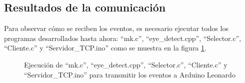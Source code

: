 \subsection{Resultados de la comunicación} \label{s4_4_3}

Para observar cómo se reciben los eventos, es necesario ejecutar todos los programas desarrollados hasta ahora: ``mk.c'', ``eye\_detect.cpp'', ``Selector.c'', ``Cliente.c'' y ``Servidor\_TCP.ino'' como se muestra en la figura \ref{fig:programas}.


\begin{figure}[htbp]
\centering
{}
\caption{Ejecución de ``mk.c'', ``eye\_detect.cpp'', ``Selector.c'', ``Cliente.c'' y ``Servidor\_TCP.ino'' para transmitir los eventos a Arduino Leonardo}
\label{fig:programas}
\end{figure}

